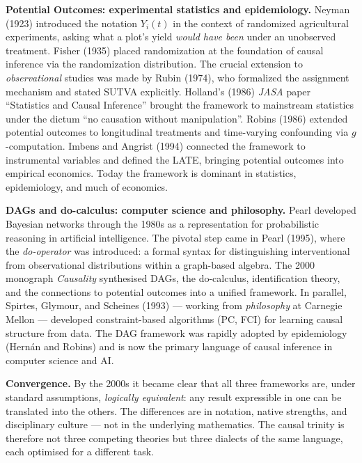 \documentclass[master.tex]{subfiles}
\begin{document}
\medskip
\noindent\textbf{\color{pocolor}Potential Outcomes: experimental statistics and epidemiology.}
Neyman (1923) introduced the notation $Y_i(t)$ in the context of randomized
agricultural experiments, asking what a plot's yield \emph{would have been}
under an unobserved treatment.  Fisher (1935) placed randomization at the
foundation of causal inference via the randomization distribution.  The
crucial extension to \emph{observational} studies was made by Rubin (1974),
who formalized the assignment mechanism and stated SUTVA explicitly.
Holland's (1986) \textit{JASA} paper ``Statistics and Causal Inference''
brought the framework to mainstream statistics under the dictum ``no
causation without manipulation''.  Robins (1986) extended potential outcomes
to longitudinal treatments and time-varying confounding via $g$-computation.
Imbens and Angrist (1994) connected the framework to instrumental variables
and defined the LATE, bringing potential outcomes into empirical economics.
Today the framework is dominant in statistics, epidemiology, and much of
economics.

\medskip
\noindent\textbf{\color{dagcolor}DAGs and do-calculus: computer science and philosophy.}
Pearl developed Bayesian networks through the 1980s as a representation for
probabilistic reasoning in artificial intelligence.  The pivotal step came
in Pearl (1995), where the \emph{do-operator} was introduced: a formal
syntax for distinguishing interventional from observational distributions
within a graph-based algebra.  The 2000 monograph \textit{Causality}
synthesised DAGs, the do-calculus, identification theory, and the
connections to potential outcomes into a unified framework.  In parallel,
Spirtes, Glymour, and Scheines (1993) --- working from \emph{philosophy} at
Carnegie Mellon --- developed constraint-based algorithms (PC, FCI) for
learning causal structure from data.  The DAG framework was rapidly adopted
by epidemiology (Hern\'{a}n and Robins) and is now the primary language of
causal inference in computer science and AI.

\medskip
\noindent\textbf{Convergence.}
By the 2000s it became clear that all three frameworks are, under standard
assumptions, \emph{logically equivalent}: any result expressible in one can
be translated into the others.  The differences are in notation, native
strengths, and disciplinary culture --- not in the underlying mathematics.
The causal trinity is therefore not three competing theories but three
dialects of the same language, each optimised for a different task.
\end{document}
